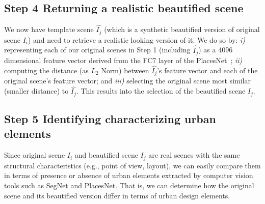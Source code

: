 \subsection*{Step 4 Returning a realistic beautified scene}
 We now have template scene $\hat{I_j}$ (which is a synthetic beautified version of original scene $I_i$) and need to retrieve a realistic looking version of it. We do so by: \emph{i)} representing each of our original scenes in Step 1 (including $\hat{I_j}$) as a 4096 dimensional feature vector derived from the FC7 layer of the PlacesNet~\cite{zhou2014learning}; \emph{ii)} computing the distance (as $L_2$ Norm) between $\hat{I_j}$'s feature vector and each of the original scene's feature vector; and \emph{iii)} selecting the original scene most similar (smaller distance) to $\hat{I_j}$. This results into the selection of the beautified scene $I_j$.
 
 
\subsection*{Step 5 Identifying  characterizing urban elements}
Since original scene $I_i$ and beautified scene $I_j$ are real scenes with the  same structural characteristics (e.g., point of view, layout), we can easily compare them in terms of presence or absence of urban elements extracted by computer vision tools such as SegNet and PlacesNet. That is, we can determine how the original scene and its beautified version differ in terms of urban design elements. 
 
 


